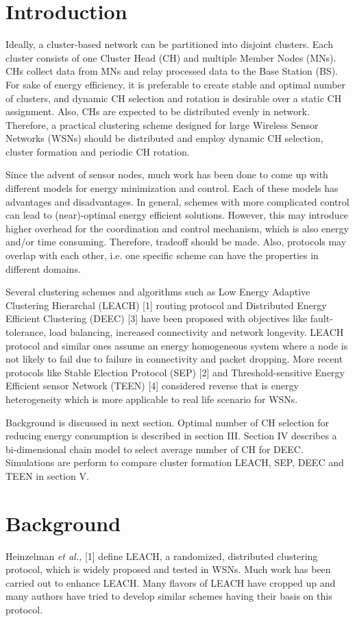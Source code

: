 \documentclass[10pt, conference, compsocconf]{IEEEtran}
\begin{document}
\section{Introduction}
Ideally, a cluster-based network can be partitioned into disjoint clusters. Each cluster consists of one Cluster Head (CH) and multiple Member Nodes (MNs). CHs collect data from MNs and relay  processed data to the Base Station (BS). For sake of energy efficiency, it is preferable to create stable and optimal number of clusters, and dynamic CH selection and rotation is desirable over a static CH assignment. Also, CHs are expected to be distributed evenly in network. Therefore, a practical clustering scheme designed for large Wireless Sensor Networks (WSNs) should be distributed and employ dynamic CH selection, cluster formation and periodic CH rotation.

Since the advent of sensor nodes, much work has been done to come up with different models for energy minimization and control. Each of these models has advantages and disadvantages. In general, schemes with more complicated control can lead to (near)-optimal energy efficient solutions. However, this may introduce higher overhead for the coordination and control mechanism, which is also energy and/or time consuming. Therefore, tradeoff should be made. Also, protocols may overlap with each other, i.e. one specific scheme can have the properties in different domains.

Several clustering schemes and algorithms such as Low Energy Adaptive Clustering Hierarchal (LEACH) [1] routing protocol and Distributed Energy Efficient Clustering (DEEC) [3] have been proposed with objectives like fault-tolerance, load balancing, increased connectivity and network longevity. LEACH protocol and similar ones assume an energy homogeneous system where a node is not likely to fail due to failure in connectivity and packet dropping. More recent protocols like Stable Election Protocol (SEP) [2] and Threshold-sensitive Energy Efficient sensor Network (TEEN) [4] considered reverse that is energy heterogeneity which is more applicable to real life scenario for WSNs.

 Background is discussed in next section. Optimal number of CH selection for reducing energy consumption is described in section III. Section IV describes a bi-dimensional chain model to select average number of CH for DEEC. Simulations are perform to compare cluster formation LEACH, SEP, DEEC and TEEN in section V.
\section{Background}
Heinzelman \textit{et al.,} [1] define LEACH, a randomized, distributed clustering protocol, which is widely proposed and tested in WSNs. Much work has been carried out to enhance LEACH. Many flavors of LEACH have cropped up and many authors have tried to develop similar schemes having their basis on this protocol.
\end{document}
